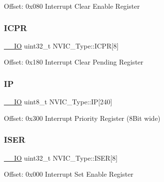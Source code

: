 Offset\+: 0x080 Interrupt Clear Enable Register ~\newline
 \mbox{\label{struct_n_v_i_c___type_a46241be64208436d35c9a4f8552575c5}} 
\subsubsection{\texorpdfstring{ICPR}{ICPR}}
{\footnotesize\ttfamily \mbox{\hyperlink{group___c_m_s_i_s___c_m3__core__definitions_gaec43007d9998a0a0e01faede4133d6be}{\+\_\+\+\_\+\+IO}} uint32\+\_\+t N\+V\+I\+C\+\_\+\+Type\+::\+I\+C\+PR\mbox{[}8\mbox{]}}

Offset\+: 0x180 Interrupt Clear Pending Register ~\newline
 \mbox{\label{struct_n_v_i_c___type_a6524789fedb94623822c3e0a47f3d06c}} 
\subsubsection{\texorpdfstring{IP}{IP}}
{\footnotesize\ttfamily \mbox{\hyperlink{group___c_m_s_i_s___c_m3__core__definitions_gaec43007d9998a0a0e01faede4133d6be}{\+\_\+\+\_\+\+IO}} uint8\+\_\+t N\+V\+I\+C\+\_\+\+Type\+::\+IP\mbox{[}240\mbox{]}}

Offset\+: 0x300 Interrupt Priority Register (8Bit wide) \mbox{\label{struct_n_v_i_c___type_af90c80b7c2b48e248780b3781e0df80f}} 
\subsubsection{\texorpdfstring{ISER}{ISER}}
{\footnotesize\ttfamily \mbox{\hyperlink{group___c_m_s_i_s___c_m3__core__definitions_gaec43007d9998a0a0e01faede4133d6be}{\+\_\+\+\_\+\+IO}} uint32\+\_\+t N\+V\+I\+C\+\_\+\+Type\+::\+I\+S\+ER\mbox{[}8\mbox{]}}

Offset\+: 0x000 Interrupt Set Enable Register ~\newline
 \mbox{\label{struct_n_v_i_c___type_acf8e38fc2e97316242ddeb7ea959ab90}} 
